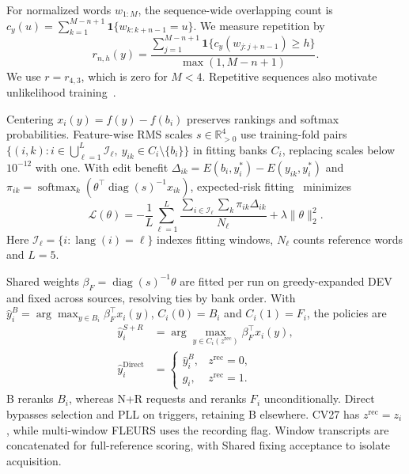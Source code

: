 \documentclass[conference,letterpaper]{IEEEtran}
\begin{document}
For normalized words $w_{1:M}$, the sequence-wide overlapping count is $c_y(u)=\sum_{k=1}^{M-n+1}\mathbf1\{w_{k:k+n-1}=u\}$. We measure repetition by
\begin{equation}
r_{n,h}(y)=\frac{\sum_{j=1}^{M-n+1}\mathbf1\{c_y(w_{j:j+n-1})\ge h\}}{\max(1,M-n+1)}.
\label{eq:repetition}
\end{equation}
We use $r=r_{4,3}$, which is zero for $M<4$. Repetitive sequences also motivate unlikelihood training~\cite{welleck2020}.

Centering $x_i(y)=f(y)-f(b_i)$ preserves rankings and softmax probabilities. Feature-wise RMS scales $s\in\mathbb R^4_{>0}$ use training-fold pairs $\{(i,k):i\in\bigcup_{\ell=1}^L\mathcal I_\ell,\ y_{ik}\in C_i\setminus\{b_i\}\}$ in fitting banks $C_i$, replacing scales below $10^{-12}$ with one. With edit benefit $\Delta_{ik}=E(b_i,y_i^*)-E(y_{ik},y_i^*)$ and $\pi_{ik}=\operatorname{softmax}_k\!\left(\theta^\top\operatorname{diag}(s)^{-1}x_{ik}\right)$, expected-risk fitting~\cite{mwer2018} minimizes
\begin{equation}
\mathcal L(\theta)=-\frac1L\sum_{\ell=1}^L\frac{\sum_{i\in\mathcal I_\ell}\sum_k\pi_{ik}\Delta_{ik}}{N_\ell}+\lambda\|\theta\|_2^2.
\label{eq:risk}
\end{equation}
Here $\mathcal I_\ell=\{i:\operatorname{lang}(i)=\ell\}$ indexes fitting windows, $N_\ell$ counts reference words and $L=5$.

Shared weights $\beta_F=\operatorname{diag}(s)^{-1}\theta$ are fitted per run on greedy-expanded DEV and fixed across sources, resolving ties by bank order. With $\hat{y}_i^B=\arg\max_{y\in B_i}\beta_F^\top x_i(y)$, $C_i(0)=B_i$ and $C_i(1)=F_i$, the policies are
\begin{equation}
\begin{aligned}
\hat{y}_i^{S+R}&=\arg\max_{y\in C_i(z^{\mathrm{rec}})}\beta_F^\top x_i(y),\\
\hat{y}_i^{\mathrm{Direct}}&=\begin{cases}\hat{y}_i^B,&z^{\mathrm{rec}}=0,\\g_i,&z^{\mathrm{rec}}=1.\end{cases}
\end{aligned}\label{eq:accept}
\end{equation}
B reranks $B_i$, whereas N+R requests and reranks $F_i$ unconditionally. Direct bypasses selection and PLL on triggers, retaining B elsewhere. CV27 has $z^{\mathrm{rec}}=z_i$, while multi-window FLEURS uses the recording flag. Window transcripts are concatenated for full-reference scoring, with Shared fixing acceptance to isolate acquisition.
\end{document}
